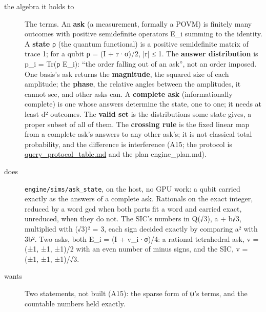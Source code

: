 \begin{description}
\item[{the algebra it holds to}] The terms. An \textbf{ask} (a measurement, formally a POVM) is finitely many outcomes with positive semidefinite operators E\_\allowbreak{}i summing to the identity. A \textbf{state} ρ (the quantum functional) is a positive semidefinite matrix of trace 1; for a qubit ρ = (I + r·σ)/2, |r| ≤ 1. The \textbf{answer distribution} is p\_\allowbreak{}i = Tr(ρ E\_\allowbreak{}i): “the order falling out of an ask”, not an order imposed. One basis's ask returns the \textbf{magnitude}, the squared size of each amplitude; the \textbf{phase}, the relative angles between the amplitudes, it cannot see, and other asks can. A \textbf{complete ask} (informationally complete) is one whose answers determine the state, one to one; it needs at least d² outcomes. The \textbf{valid set} is the distributions some state gives, a proper subset of all of them. The \textbf{crossing rule} is the fixed linear map from a complete ask's answers to any other ask's; it is not classical total probability, and the difference is interference (A15; the protocol is \hyperref[chap:query-protocol-table]{query\_\allowbreak{}protocol\_\allowbreak{}table.md} and the plan engine\_\allowbreak{}plan.md).
\item[{does}] \texttt{engine/\allowbreak{}sims/\allowbreak{}ask\_\allowbreak{}state}, on the host, no GPU work: a qubit carried exactly as the answers of a complete ask. Rationals on the exact integer, reduced by a word gcd when both parts fit a word and carried exact, unreduced, when they do not. The SIC's numbers in Q(√3), a + b√3, multiplied with (√3)² = 3, each sign decided exactly by comparing a² with 3b². Two asks, both E\_\allowbreak{}i = (I + v\_\allowbreak{}i·σ)/4: a rational tetrahedral ask, v = (±1, ±1, ±1)/2 with an even number of minus signs, and the SIC, v = (±1, ±1, ±1)/√3.
\item[{wants}] Two statements, not built (A15): the sparse form of ψ's terms, and the countable numbers held exactly.

\end{description}
